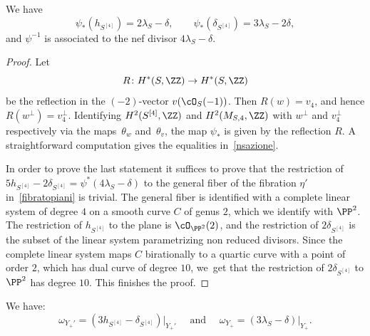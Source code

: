 \begin{prop}\label{prop:NefConeHilb4}
We have
\begin{equation}\label{nsazione}
\psi_{*}(h_{S^{[4]}}) = 2 \lambda_S - \delta, \qquad \psi_{*}(\delta_{S^{[4]}}) = 3 \lambda_S - 2\delta,
\end{equation}
and $\psi^{-1}$ is associated to the nef divisor $4 \lambda_S - \delta$.
\end{prop}

\begin{proof}
Let
\[
R\colon H^*(S,\ZZ)\to H^*(S,\ZZ)
\]
be the reflection in the $(-2)$-vector $v(\cO_S(-1))$. Then $R(w)\!=\!v_4$, and hence \hbox{$R(w^{\bot})\!=\!v_4^{\bot}$}. Identifying $H^2(S^{[4]},\ZZ)$ and $H^2(M_{S,4},\ZZ)$ with $w^{\bot}$ and $v_4^{\bot}$ respectively via the maps~$\theta_w$ and~$\theta_v$, the map $\psi_{*}$ is given by the reflection $R$. A straightforward computation gives the equalities in~\eqref{nsazione}.

In order to prove the last statement it suffices to prove that the restriction of $5h_{S^{[4]}}-2\delta_{S^{[4]}}=\psi^{*}(4\lambda_S-\delta)$ to the general fiber of the fibration $\eta'$ in~\eqref{fibratopiani} is trivial. The general fiber is identified with a complete linear system of degree $4$ on a smooth curve $C$ of genus $2$, which we identify with $\PP^2$. The restriction of $h_{S^{[4]}}$ to the plane is $\cO_{\PP^2}(2)$, and the restriction of $2\delta_{S^{[4]}}$ is the subset of the linear system parametrizing non reduced divisors. Since the complete linear system maps $C$ birationally to a quartic curve with a point of order $2$, which has dual curve of degree $10$, we~get that the restriction of $2\delta_{S^{[4]}}$ to $\PP^2$ has degree $10$. This finishes the proof.
\end{proof}

\begin{lemm}\label{lem:CanonicalDivisors}
We have:
\[
\omega_{Y_+'} = (3 h_{S^{[4]}} - \delta_{S^{[4]}})\vert_{Y_+'} \quad
\text{ and }\quad \omega_{Y_+} = (3 \lambda_S - \delta)\vert_{Y_+}.
\]
\end{lemm}

